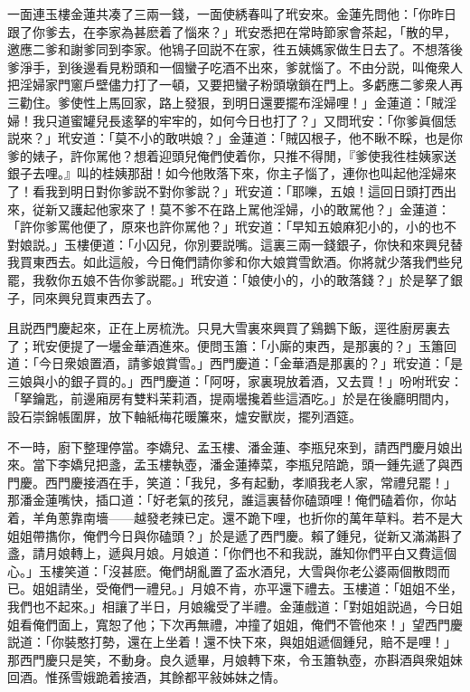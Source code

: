 一面連玉樓金蓮共凑了三兩一錢，一面使綉春叫了玳安來。金蓮先問他：「你昨日跟了你爹去，在李家為甚麽着了惱來？」玳安悉把在常時節家會茶起，「散的早，邀應二爹和謝爹同到李家。他鴇子回説不在家，徃五姨媽家做生日去了。不想落後爹淨手，到後邊看見粉頭和一個蠻子吃酒不出來，爹就惱了。不由分説，叫俺衆人把淫婦家門窻戶壁儘力打了一頓，又要把蠻子粉頭墩鎖在門上。多虧應二爹衆人再三勸住。爹使性上馬回家，路上發狠，到明日還要擺布淫婦哩！」金蓮道：「賊淫婦！我只道蜜罐兒長逺拏的牢牢的，如何今日也打了？」又問玳安：「你爹眞個恁説來？」玳安道：「莫不小的敢哄娘？」金蓮道：「賊囚根子，他不瞅不睬，也是你爹的婊子，許你駡他？想着迎頭兒俺們使着你，只推不得閒，『爹使我徃桂姨家送銀子去哩。』叫的桂姨那甜！如今他敗落下來，你主子惱了，連你也叫起他淫婦來了！看我到明日對你爹説不對你爹説？」玳安道：「耶嚛，五娘！這回日頭打西出來，従新又護起他家來了！莫不爹不在路上駡他淫婦，小的敢駡他？」金蓮道：「許你爹罵他便了，原來也許你駡他？」玳安道：「早知五娘麻犯小的，小的也不對娘説。」玉樓便道：「小囚兒，你別要説嘴。這裏三兩一錢銀子，你快和來興兒替我買東西去。如此這般，今日俺們請你爹和你大娘賞雪飲酒。你將就少落我們些兒罷，我敎你五娘不告你爹説罷。」玳安道：「娘使小的，小的敢落錢？」於是拏了銀子，同來興兒買東西去了。

且説西門慶起來，正在上房梳洗。只見大雪裏來興買了鷄鵝下飯，逕徃廚房裏去了；玳安便提了一壜金華酒進來。便問玉簫：「小廝的東西，是那裏的？」玉簫回道：「今日衆娘置酒，請爹娘賞雪。」西門慶道：「金華酒是那裏的？」玳安道：「是三娘與小的銀子買的。」西門慶道：「阿呀，家裏現放着酒，又去買！」吩咐玳安：「拏鑰匙，前邊廂房有雙料茉莉酒，提兩壜攙着些這酒吃。」於是在後廳明間内，設石崇錦帳圍屏，放下軸紙梅花暖簾來，爐安獸炭，擺列酒筵。

不一時，廚下整理停當。李嬌兒、孟玉樓、潘金蓮、李瓶兒來到，請西門慶月娘出來。當下李嬌兒把盞，孟玉樓執壺，潘金蓮捧菜，李瓶兒陪跪，頭一鍾先遞了與西門慶。西門慶接酒在手，笑道：「我兒，多有起動，孝順我老人家，常禮兒罷！」那潘金蓮嘴快，插口道：「好老氣的孩兒，誰這裏替你磕頭哩！俺們磕着你，你站着，羊角蔥靠南墻——越發老辣已定。還不跪下哩，也折你的萬年草料。若不是大姐姐帶㩦你，俺們今日與你磕頭？」於是遞了西門慶。賴了鍾兒，従新又滿滿斟了盞，請月娘轉上，遞與月娘。月娘道：「你們也不和我説，誰知你們平白又費這個心。」玉樓笑道：「沒甚麽。俺們胡亂置了盃水酒兒，大雪與你老公婆兩個散悶而已。姐姐請坐，受俺們一禮兒。」月娘不肯，亦平還下禮去。玉樓道：「姐姐不坐，我們也不起來。」相讓了半日，月娘纔受了半禮。金蓮戲道：「對姐姐説過，今日姐姐看俺們面上，寬恕了他；下次再無禮，冲撞了姐姐，俺們不管他來！」望西門慶説道：「你裝憨打勢，還在上坐着！還不快下來，與姐姐遞個鍾兒，賠不是哩！」那西門慶只是笑，不動身。良久遞畢，月娘轉下來，令玉簫執壺，亦斟酒與衆姐妹回酒。惟孫雪娥跪着接酒，其餘都平敍姊妹之情。

